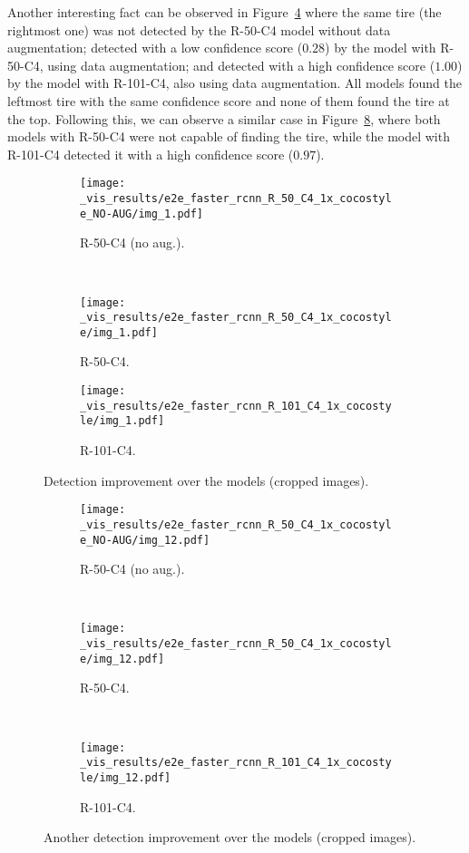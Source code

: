 %
Another interesting fact can be observed in Figure~\ref{fig:improv_1} where the same tire (the rightmost one) was not detected by the R-50-C4 model without data augmentation; detected with a low confidence score ($0.28$) by the model with R-50-C4, using data augmentation; and detected with a high confidence score ($1.00$) by the model with R-101-C4, also using data augmentation.
All models found the leftmost tire with the same confidence score and none of them found the tire at the top.
Following this, we can observe a similar case in Figure~\ref{fig:improv_2}, where both models with R-50-C4 were not capable of finding the tire, while the model with R-101-C4 detected it with a high confidence score ($0.97$).
%
\begin{figure}[th!]
  \centering
  \begin{subfigure}[t]{.9\linewidth}
    \centering
    \texttt{[image: \_vis\_results/e2e\_faster\_rcnn\_R\_50\_C4\_1x\_cocostyle\_NO-AUG/img\_1.pdf]}
    \caption{R-50-C4 (no aug.).}
    \label{fig:improv_50N}
  \end{subfigure}\\
  \begin{subfigure}[t]{0.9\linewidth}
    \centering
    \texttt{[image: \_vis\_results/e2e\_faster\_rcnn\_R\_50\_C4\_1x\_cocostyle/img\_1.pdf]}
    \caption{R-50-C4.}
    \label{fig:improv_50}
  \end{subfigure}
  \begin{subfigure}[t]{0.9\linewidth}
    \centering
    \texttt{[image: \_vis\_results/e2e\_faster\_rcnn\_R\_101\_C4\_1x\_cocostyle/img\_1.pdf]}
    \caption{R-101-C4.}
    \label{fig:improv_101}
  \end{subfigure}
  \caption{Detection improvement over the models (cropped images).}
  \label{fig:improv_1}
\end{figure}
%
%
\begin{figure}[th!]
  \centering
  \begin{subfigure}[t]{.49\linewidth}
    \centering
    \texttt{[image: \_vis\_results/e2e\_faster\_rcnn\_R\_50\_C4\_1x\_cocostyle\_NO-AUG/img\_12.pdf]}
    \caption{R-50-C4 (no aug.).}
    \label{fig:improv_50N}
  \end{subfigure}~
  \begin{subfigure}[t]{0.49\linewidth}
    \centering
    \texttt{[image: \_vis\_results/e2e\_faster\_rcnn\_R\_50\_C4\_1x\_cocostyle/img\_12.pdf]}
    \caption{R-50-C4.}
    \label{fig:improv_50}
  \end{subfigure}\\
  \begin{subfigure}[t]{0.49\linewidth}
    \centering
    \texttt{[image: \_vis\_results/e2e\_faster\_rcnn\_R\_101\_C4\_1x\_cocostyle/img\_12.pdf]}
    \caption{R-101-C4.}
    \label{fig:improv_101}
  \end{subfigure}
  \caption{Another detection improvement over the models (cropped images).}
  \label{fig:improv_2}
\end{figure}
%

